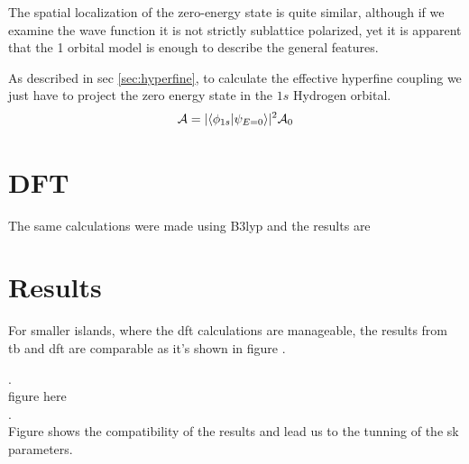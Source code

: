 The spatial localization of the zero-energy state is quite similar, although if we examine the wave function it is not strictly sublattice polarized, yet it is apparent that the 1 orbital model is enough to describe the general features.

As described in sec \ref{sec:hyperfine}, to calculate the effective hyperfine coupling we just have to project the zero energy state in the $1s$ Hydrogen orbital.
\begin{equation}
\mathcal{A} = |\langle\phi_{1s}|\psi_{E=0}\rangle|^{2}\mathcal{A}_{0}
\end{equation}




\section{DFT}
The same calculations were made using B3lyp and the results are \\


\section{Results}
For smaller islands, where the \ac{dft} calculations are manageable, the results from \ac{tb} and \ac{dft} are comparable as it's shown in figure .

.\\

figure here\\

.\\

Figure  shows the compatibility of the results and lead us to the tunning of the \ac{sk} parameters.

